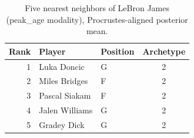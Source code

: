 \begin{table}[htbp]
  \centering\small
  \begin{tabular}{rllc}
    \toprule
    Rank & Player & Position & Archetype \\
    \midrule
    1 & Luka Doncic & G & 2 \\
    2 & Miles Bridges & F & 2 \\
    3 & Pascal Siakam & F & 2 \\
    4 & Jalen Williams & G & 2 \\
    5 & Gradey Dick & G & 2 \\
    \bottomrule
  \end{tabular}
  \caption{Five nearest neighbors of LeBron James (peak_age modality), Procrustes-aligned posterior mean.}
  \label{tab:LeBron_James_neighbors_peak_age}
\end{table}

